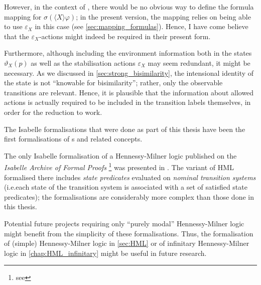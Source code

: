 \begin{isabellebody}
\begin{isamarkuptext}
However, in the context of \HMLt{}, there would be no obvious way to define the formula mapping for $\sigma(\langle X \rangle \varphi)$; in the present version, the mapping relies on being able to use $\varepsilon_X$ in this case (see \cref{sec:mapping_formulas}). Hence, I have come believe that the $\varepsilon_X$-actions might indeed be required in their present form.

Furthermore, although including the environment information both in the states $\vartheta_X(p)$ as well as the stabilisation actions $\varepsilon_X$ may seem redundant, it might be necessary. As we discussed in \cref{sec:strong_bisimilarity}, the intensional identity of the state is not \enquote{knowable for bisimilarity}; rather, only the observable transitions are relevant. Hence, it is plausible that the information about allowed actions is actually required to be included in the transition labels themselves, in order for the reduction to work.%
\end{isamarkuptext}\isamarkuptrue%
%
\isadelimdocument
%
\endisadelimdocument
%
\isatagdocument
%
\isamarkuptrue%
%
\endisatagdocument
{\isafolddocument}%
%
\isadelimdocument
%
\endisadelimdocument
%
\begin{isamarkuptext}%
The Isabelle formalisations that were done as part of this thesis have been the first formalisations of \LTSt{}s and related concepts. 

The only Isabelle formalisation of a Hennessy-Milner logic published on the \emph{Isabelle Archive of Formal Proofs}%
\footnote{see }
was presented in \cite{weber2021modal}.
The variant of HML formalised there includes \emph{state predicates} evaluated on \emph{nominal transition systems} (i.e.\@ each state of the transition system is associated with a set of satisfied state predicates); the formalisations are considerably more complex than those done in this thesis. 

Potential future projects requiring only \enquote{purely modal} Hennessy-Milner logic might benefit from the simplicity of these formalisations. Thus, the formalisation of (simple) Hennessy-Milner logic in \cref{sec:HML} or of infinitary Hennessy-Milner logic in \cref{chap:HML_infinitary} might be useful in future research.%
\end{isamarkuptext}\isamarkuptrue%
%
\isadelimtheory
%
\endisadelimtheory
%
\isatagtheory
%
\endisatagtheory
{\isafoldtheory}%
%
\isadelimtheory
%
\endisadelimtheory
%
\end{isabellebody}%
